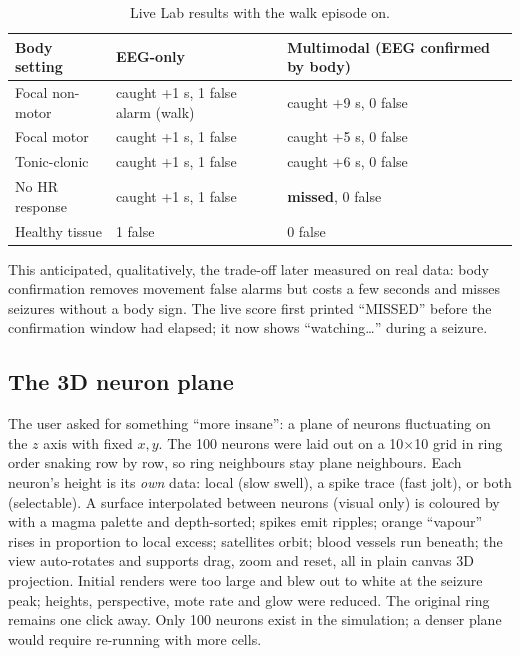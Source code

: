 \begin{table}[H]
\centering\small
\caption{Live Lab results with the walk episode on.}
\begin{tabular}{@{}lll@{}}
\toprule
Body setting & EEG-only & Multimodal (EEG confirmed by body) \\
\midrule
Focal non-motor & caught +1 s, 1 false alarm (walk) & caught +9 s, 0 false \\
Focal motor & caught +1 s, 1 false & caught +5 s, 0 false \\
Tonic-clonic & caught +1 s, 1 false & caught +6 s, 0 false \\
No HR response & caught +1 s, 1 false & \textbf{missed}, 0 false \\
Healthy tissue & 1 false & 0 false \\
\bottomrule
\end{tabular}
\end{table}

This anticipated, qualitatively, the trade-off later measured on real data: body confirmation removes movement false alarms but costs a few seconds and misses seizures without a body sign. The live score first printed ``MISSED'' before the confirmation window had elapsed; it now shows ``watching\dots'' during a seizure.

\subsection{The 3D neuron plane}

The user asked for something ``more insane'': a plane of neurons fluctuating on the $z$ axis with fixed $x,y$. The 100 neurons were laid out on a 10$\times$10 grid in ring order snaking row by row, so ring neighbours stay plane neighbours. Each neuron's height is its \emph{own} data: local \Ko{} (slow swell), a spike trace (fast jolt), or both (selectable). A surface interpolated between neurons (visual only) is coloured by \Kp{} with a magma palette and depth-sorted; spikes emit ripples; orange \Kp{} ``vapour'' rises in proportion to local \Kp{} excess; \Clm{} satellites orbit; blood vessels run beneath; the view auto-rotates and supports drag, zoom and reset, all in plain canvas 3D projection. Initial renders were too large and blew out to white at the seizure peak; heights, perspective, mote rate and glow were reduced. The original ring remains one click away. Only 100 neurons exist in the simulation; a denser plane would require re-running  with more cells.

